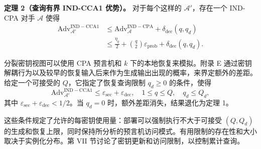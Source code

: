 \textbf{定理 2（查询有界 IND-CCA1 优势）。} 对于每个这样的 \(\mathcal{A}'\)，存在一个 IND-CPA 对手 \(\mathcal{A}\) 使得
\begin{equation}
\begin{aligned}
\mathrm{Adv}_{\mathcal{A}'}^{\mathrm{IND-CCA1}} &\le \mathrm{Adv}_{\mathcal{A}}^{\mathrm{IND-CPA}} + \delta_{\mathrm{dec}}(q, q_d) \\
&\le \frac{\eta_q}{2} + \binom{q}{2} \varepsilon_{\mathrm{prob}} + \delta_{\mathrm{dec}}(q, q_d).
\end{aligned} \tag{19}
\end{equation}

分裂密钥视图可以使用 CPA 预言机和 \(k\) 下的本地恢复来模拟。附录 E 通过密钥解耦行为以及较早的恢复输入后来作为生成输出出现的概率，来界定额外的差距。给定一个可接受的 \(Q\)，它指定了恢复查询限制 \(q_d \ge 0\) 的条件，使得
\begin{equation}
\mathrm{Adv}_{\mathcal{A}'}^{\mathrm{IND-CCA1}} \le \varepsilon_{\mathrm{sec}} + \varepsilon_{\mathrm{dec}}, \quad 1 \le q \le Q, \quad q_d \le Q_d, \tag{20}
\end{equation}
其中 \(\varepsilon_{\mathrm{sec}} + \varepsilon_{\mathrm{dec}} < 1/2\)。当 \(q_d = 0\) 时，额外差距消失，结果退化为定理 1。

这些条件规定了允许的每密钥使用量：部署可以强制执行不大于可接受 \((Q, Q_d)\) 的生成和恢复上限，同时保持所分析的预言机访问模式。有用限制的存在性和大小取决于实例化分布。第 VII 节讨论了密钥更新和访问限制，以控制累计查询。
